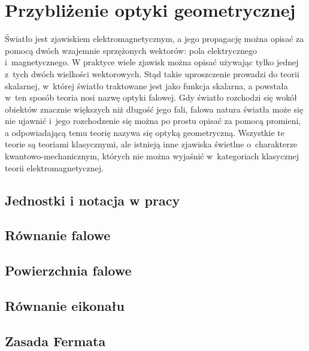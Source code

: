 \documentclass[a4paper,12pkt]{report}
\begin{document}


\chapter{Przybliżenie optyki geometrycznej}

\indent Światło jest zjawiskiem elektromagnetycznym, a jego propagację można opisać za pomocą dwóch wzajemnie sprzężonych wektorów: pola elektrycznego i~magnetycznego. W praktyce wiele zjawisk można opisać używając tylko jednej z~tych dwóch wielkości wektorowych. Stąd takie uproszczenie prowadzi do teorii skalarnej, w~której światło traktowane jest jako funkcja skalarna, a powstała w~ten sposób teoria nosi nazwę optyki falowej. Gdy światło rozchodzi się wokół obiektów znacznie większych niż długość jego fali, falowa natura światła może się nie ujawnić i~jego rozchodzenie się można po prostu opisać za pomocą promieni, a odpowiadającą temu teorię nazywa się optyką geometryczną. Wszystkie te teorie są teoriami klasycznymi, ale istnieją inne zjawiska świetlne o~charakterze kwantowo-mechanicznym, których nie można wyjaśnić w~kategoriach klasycznej teorii elektromagnetycznej.

\section{Jednostki i notacja w pracy}



\section{Równanie falowe}



\section{Powierzchnia falowe}



\section{Równanie eikonału}



\section{Zasada Fermata}
\end{document}

